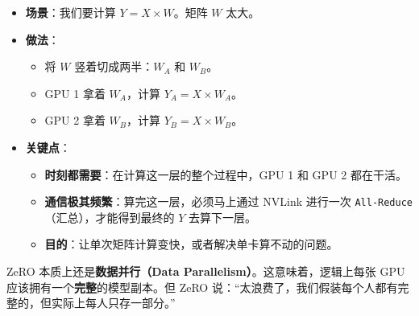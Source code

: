 \begin{itemize}
\tightlist
\item
  \textbf{场景}：我们要计算 \(Y = X \times W\)。矩阵 \(W\) 太大。
\item
  \textbf{做法}：

  \begin{itemize}
  \tightlist
  \item
    将 \(W\) 竖着切成两半：\(W_A\) 和 \(W_B\)。
  \item
    GPU 1 拿着 \(W_A\)，计算 \(Y_A = X \times W_A\)。
  \item
    GPU 2 拿着 \(W_B\)，计算 \(Y_B = X \times W_B\)。
  \end{itemize}
\item
  \textbf{关键点}：

  \begin{itemize}
  \tightlist
  \item
    \textbf{时刻都需要}：在计算这一层的整个过程中，GPU 1 和 GPU 2 都在干活。
  \item
    \textbf{通信极其频繁}：算完这一层，必须马上通过 NVLink 进行一次 \texttt{All-Reduce}（汇总），才能得到最终的 \(Y\) 去算下一层。
  \item
    \textbf{目的}：让单次矩阵计算变快，或者解决单卡算不动的问题。
  \end{itemize}
\end{itemize}

ZeRO 本质上还是\textbf{数据并行（Data Parallelism）}。这意味着，逻辑上每张 GPU 应该拥有一个\textbf{完整}的模型副本。但 ZeRO 说：``太浪费了，我们假装每个人都有完整的，但实际上每人只存一部分。''

